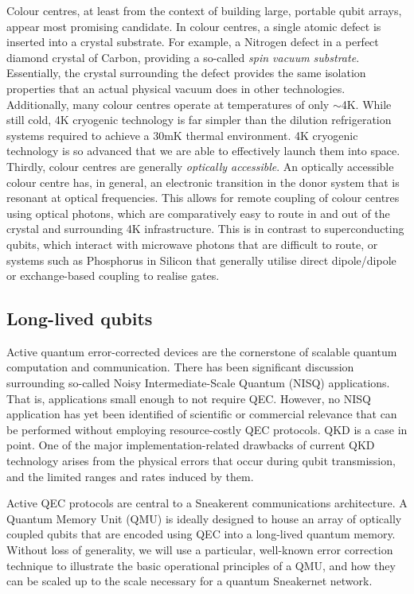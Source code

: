 \documentclass[twocolumn, aps, rmp, amsmath, amssymb, nofootinbib, superscriptaddress, longbibliography, floatfix, table-of-contents, eqsecnum]{revtex4-2}
\begin{document}
Colour centres, at least from the context of building large, portable qubit arrays, appear most promising candidate. In colour centres, a single atomic defect is inserted into a crystal substrate. For example, a Nitrogen defect in a perfect diamond crystal of Carbon, providing a so-called \textit{spin vacuum substrate}. Essentially, the crystal surrounding the defect provides the same isolation properties that an actual physical vacuum does in other technologies. Additionally, many colour centres operate at temperatures of only $\sim$4K. While still cold, 4K cryogenic technology is far simpler than the dilution refrigeration systems required to achieve a 30mK thermal environment. 4K cryogenic technology is so advanced that we are able to effectively launch them into space. Thirdly, colour centres are generally \textit{optically accessible}. An optically accessible colour centre has, in general, an electronic transition in the donor system that is resonant at optical frequencies. This allows for remote coupling of colour centres using optical photons, which are comparatively easy to route in and out of the crystal and surrounding 4K infrastructure. This is in contrast to superconducting qubits, which interact with microwave photons that are difficult to route, or systems such as Phosphorus in Silicon that generally utilise direct dipole/dipole or exchange-based coupling to realise gates. 

\subsection{Long-lived qubits}

Active quantum error-corrected devices are the cornerstone of scalable quantum computation and communication. There has been significant discussion surrounding so-called Noisy Intermediate-Scale Quantum (NISQ) applications. That is, applications small enough to not require QEC. However, no NISQ application has yet been identified of scientific or commercial relevance that can be performed without employing resource-costly QEC protocols. QKD is a case in point. One of the major implementation-related drawbacks of current QKD technology arises from the physical errors that occur during qubit transmission, and the limited ranges and rates induced by them. 

Active QEC protocols are central to a Sneakerent communications architecture. A Quantum Memory Unit (QMU) is ideally designed to house an array of optically coupled qubits that are encoded using QEC into a long-lived quantum memory. Without loss of generality, we will use a particular, well-known error correction technique to illustrate the basic operational principles of a QMU, and how they can be scaled up to the scale necessary for a quantum Sneakernet network.
\end{document}
